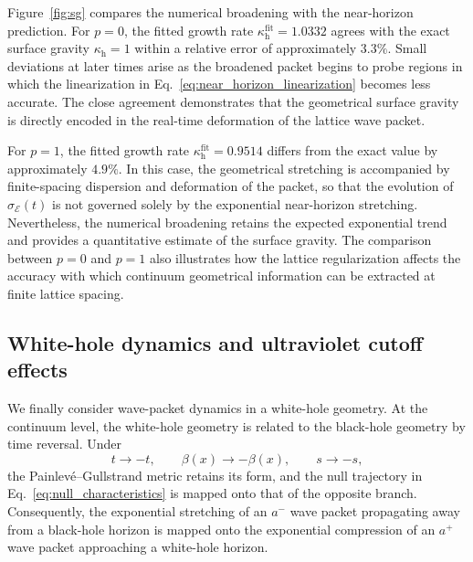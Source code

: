 \documentclass[reprint,amsmath,amssymb,aps,prb,showkeys,superscriptaddress]{revtex4-2}
\begin{document}
Figure~\ref{fig:sg} compares the numerical broadening with the
near-horizon prediction. For $p=0$, the fitted growth rate
$\kappa_{\mathrm h}^{\mathrm{fit}}=1.0332$ agrees with the exact
surface gravity $\kappa_{\mathrm h}=1$ within a relative error of
approximately $3.3\%$. Small deviations at later times arise as the
broadened packet begins to probe regions in which the linearization
in Eq.~\eqref{eq:near_horizon_linearization} becomes less accurate.
The close agreement demonstrates that the geometrical surface
gravity is directly encoded in the real-time deformation of the
lattice wave packet.

For $p=1$, the fitted growth rate
$\kappa_{\mathrm h}^{\mathrm{fit}}=0.9514$ differs from the exact
value by approximately $4.9\%$. In this case, the geometrical stretching is
accompanied by finite-spacing dispersion and deformation of the
packet, so that the evolution of $\sigma_{\mathcal E}(t)$ is not
governed solely by the exponential near-horizon stretching.
Nevertheless, the numerical broadening retains the expected
exponential trend and provides a quantitative estimate of the
surface gravity. The comparison between $p=0$ and $p=1$ also
illustrates how the lattice regularization affects the accuracy with
which continuum geometrical information can be extracted at finite
lattice spacing.

\subsection{White-hole dynamics and ultraviolet cutoff effects}
\label{subsec:white_hole}

We finally consider wave-packet dynamics in a white-hole geometry.
At the continuum level, the white-hole geometry is related to the
black-hole geometry by time reversal. Under
\begin{equation}
  t\rightarrow -t,
  \qquad
  \beta(x)\rightarrow-\beta(x),
  \qquad
  s\rightarrow-s,
  \label{eq:bh_wh_time_reversal}
\end{equation}
the Painlev\'e--Gullstrand metric retains its form, and the null
trajectory in Eq.~\eqref{eq:null_characteristics} is mapped onto
that of the opposite branch. Consequently, the exponential
stretching of an $a^-$ wave packet propagating away from a
black-hole horizon is mapped onto the exponential compression of an
$a^+$ wave packet approaching a white-hole horizon.
\end{document}
